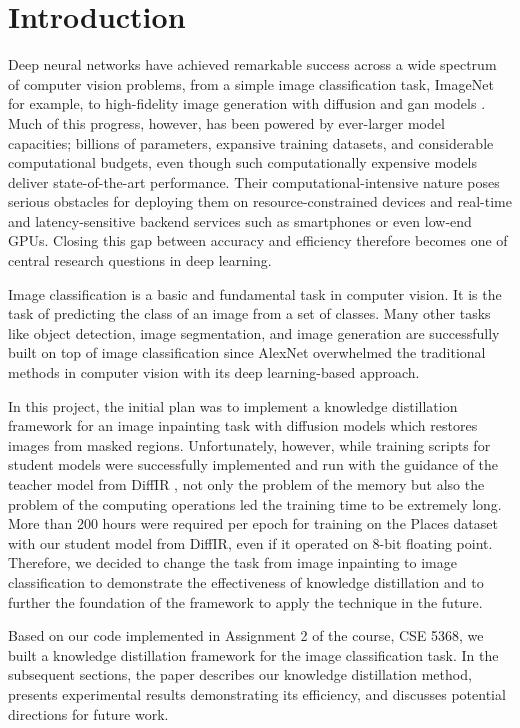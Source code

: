 \section{Introduction}

Deep neural networks have achieved remarkable success across a wide spectrum of computer vision problems,
from a simple image classification task, ImageNet \cite{deng2009imagenet} for example, to high-fidelity image generation with diffusion \cite{ho2020denoising, rombach2022high, xia2023diffir} and \gls*{gan} models \cite{goodfellow2014generative, nazeri2019edgeconnect}.
Much of this progress, however, has been powered by ever-larger model capacities;
billions of parameters, expansive training datasets, and considerable computational budgets,
even though such computationally expensive models deliver state-of-the-art performance.
Their computational-intensive nature poses serious obstacles for deploying them
on resource-constrained devices and real-time and latency-sensitive backend services
such as smartphones or even low-end GPUs.
Closing this gap between accuracy and efficiency therefore becomes one of central research questions in deep learning.

Image classification is a basic and fundamental task in computer vision.
It is the task of predicting the class of an image from a set of classes.
Many other tasks like object detection, image segmentation, and image generation
are successfully built on top of image classification
since AlexNet \cite{krizhevsky2012imagenet} overwhelmed the traditional methods
in computer vision with its deep learning-based approach.

In this project, the initial plan was to implement a knowledge distillation framework
for an image inpainting task with diffusion models
which restores images from masked regions.
Unfortunately, however, while training scripts for student models were successfully implemented and run with the guidance of the teacher model from DiffIR \cite{xia2023diffir},
not only the problem of the memory but also the problem of the computing operations
led the training time to be extremely long.
More than 200 hours were required per epoch for training on the Places dataset \cite{zhou2017places} with our student model from DiffIR,
even if it operated on 8-bit floating point.
Therefore, we decided to change the task from image inpainting to image classification
to demonstrate the effectiveness of knowledge distillation
and to further the foundation of the framework to apply the technique in the future.

Based on our code implemented in Assignment 2 of the course, CSE 5368,
we built a knowledge distillation framework for the image classification task.
In the subsequent sections, the paper describes our knowledge distillation method,
presents experimental results demonstrating its efficiency,
and discusses potential directions for future work.